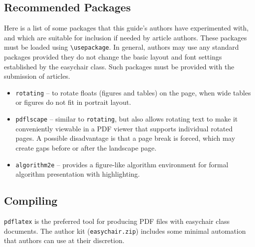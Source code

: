 \documentclass{easychair}
\newcommand{\easychair}{\textsf{easychair}}
\begin{document}
\subsection{Recommended Packages}
\label{sect:recommended-packages}

Here is a list of some packages that this guide's authors have experimented 
with, and which are suitable for inclusion if needed by article authors.
These packages must be loaded using \verb+\usepackage+.
In general, authors may use any standard packages provided they do not change
the basic layout and font settings established by the {\easychair} class.
Such packages must be provided with the submission of articles.

\begin{itemize}
\item
\texttt{rotating} \cite{rotating-package} -- to rotate floats (figures and
tables) on the page, when wide tables or figures do not fit in portrait layout.

\item
\texttt{pdflscape} \cite{pdflscape-package} -- similar to \texttt{rotating}, 
but also allows rotating text to make it conveniently viewable in a PDF 
viewer that supports individual rotated pages.
A possible disadvantage is that a page break is forced, which may create
gaps before or after the landscape page.

\item
\texttt{algorithm2e} \cite{algorithm2e-package} -- provides a figure-like
algorithm environment for formal algorithm presentation with highlighting.

\end{itemize}

\subsection{Compiling}
\label{sect:compiling}

\texttt{pdflatex} \cite{pdflatex-instructions} is the preferred tool for
producing PDF files with {\easychair} class documents.
The author kit (\texttt{easychair.zip}) includes some minimal automation 
that authors can use at their discretion.
\end{document}
